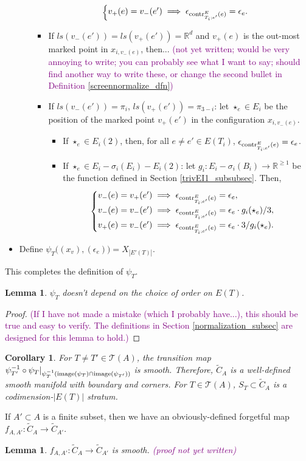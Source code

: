 \documentclass[11pt]{article}
\newtheorem{lmm}[thm]{Lemma}
\newtheorem{crl}[thm]{Corollary}
\theoremstyle{definition}
\theoremstyle{remark}
\def\wt#1{\widetilde{#1}}
\def\R{\mathbb{R}}
\def\cT{\mathcal{T}}
\def\cmt#1{\textcolor{purple}{(#1)}}
\def\tn#1{\textnormal{#1}}
\begin{document}
\begin{itemize}
\begin{itemize}
\begin{itemize}
$$\begin{cases}
v_+(e)=v_-(e')\implies \epsilon_{\tn{contr}^E_{T_i;e'}(e)}=\epsilon_e.
\end{cases}$$
\item If $ls(v_-(e'))=ls(v_+(e'))=\R^d$ and $v_+(e)$ is the out-most marked point in $x_{i,v_-(e)}$, then...
\cmt{not yet written; would be very annoying to write; you can probably see what I want to say; should find another way to write these, or change the second bullet in Definition  \ref{screennormalize_dfn}}
\item If $ls(v_-(e'))=\pi_i$, $ls(v_+(e'))=\pi_{3-i}$: let $\star_e\in E_i$ be the position of the marked point $v_+(e')$ in the configuration $x_{i,v_-(e)}$.  
\begin{itemize}
\item If $\star_e\in E_i(2)$, then, for all $e\neq e'\in E(T_i)$, $\epsilon_{\tn{contr}^E_{T_i;e'}(e)}=\epsilon_e$.
\item If $\star_e\in E_i-\sigma_i(E_i)-E_i(2)$: let $g_i:E_i-\sigma_i(B_i)\to \R^{\ge1}$ be the function defined in Section \ref{trivEI1_subsubsec}. 
Then, 
$$\begin{cases}
v_-(e)=v_+(e')\implies \epsilon_{\tn{contr}^E_{T_i;e'}(e)}=\epsilon_e,\\
v_-(e)=v_-(e')\implies \epsilon_{\tn{contr}^E_{T_i;e'}(e)}=\epsilon_e\cdot g_i(\star_e)/3,\\ 
v_+(e)=v_-(e')\implies \epsilon_{\tn{contr}^E_{T_i;e'}(e)}=\epsilon_e\cdot3/g_i(\star_e).
\end{cases}$$
\end{itemize}
\end{itemize}
\end{itemize}
\item Define $\psi_T\big((x_v),(\epsilon_e)\big)=X_{|E'(T)|}$. 
\end{itemize}
This completes the definition of $\psi_T$. 

\begin{lmm}\label{psicommute_lmm}
$\psi_T$ doesn't depend on the choice of order on $E(T)$. 
\end{lmm}
\begin{proof}
\cmt{If I have not made a mistake (which I probably have...), this should be true and easy to verify. The definitions in Section \ref{normalization_subsec} are designed for this lemma to hold.}
\end{proof}

\begin{crl}
For $T\neq T'\in \cT(A)$, the transition map $\psi_{T'}^{-1}\circ\psi_{T}|_{\psi_T^{-1}(\tn{image}(\psi_T)\cap\tn{image}(\psi_{T'}))}$ is smooth. 
Therefore, $\wt{C}_A$ is a well-defined smooth manifold with boundary and corners. For $T\in\cT(A)$, $S_T\subset \wt{C}_A$ is a codimension-$|E(T)|$ stratum. 
\end{crl}

If $A'\subset A$ is a finite subset, then we have an obviously-defined forgetful map $f_{A,A'}:\wt{C}_A\to\wt{C}_{A'}$. 

\begin{lmm}
$f_{A,A'}:\wt{C}_A\to\wt{C}_{A'}$ is smooth. \cmt{proof not yet written}
\end{lmm}
\end{document}

